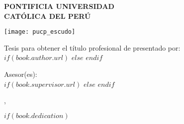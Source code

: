 \pagestyle{empty} %

\begin{titlepage}
\begin{center}

\vspace*{.06\textheight}
{\MakeUppercase{\textbf{PONTIFICIA UNIVERSIDAD \\ CATÓLICA DEL PERÚ}}\par}\vspace{0.25cm} %
\MakeUppercase{\textbf{\facname}}\vspace{0.5cm} %

\texttt{[image: pucp\_escudo]}\vspace{0.5cm}

{\textbf{\ttitle}\par}\vspace{0.4cm} %

{Tesis para obtener el título profesional de \degreename}{ presentado por:}\\[0.3cm] %

$if(book.author.url)$
\href{$book.author.url$}{\authorname} %
$else$
\authorname
$endif$

{Asesor(es):}\\[0.4cm]
$if(book.supervisor.url)$%
\href{$book.supervisor.url$}{\supname} %
$else$%
\supname
$endif$

{\cityname}{, }{\dateyearname}

\vfill
\end{center}
\end{titlepage}

$if(book.dedication)$

\dedicatory{} 
\newpage

